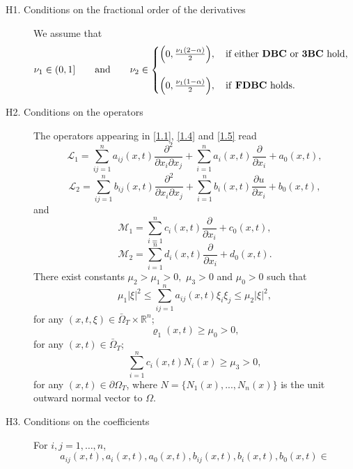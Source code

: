 \documentclass[reqno]{amsart}
\theoremstyle{definition}
\numberwithin{equation}{section}
\begin{document}
\begin{description}
\smallskip
 \item[H1. Conditions on the fractional order of the derivatives] We assume that
\begin{equation*}
\nu_1\in(0,1]\qquad \text{and}\qquad
\nu_2\in
\begin{cases}
\Big(0,\frac{\nu_1(2-\alpha)}{2}\Big),\quad\text{if either \textbf{DBC} or \textbf{3BC} hold},\\
\\
\Big(0,\frac{\nu_1(1-\alpha)}{2}\Big), \quad\text{if  \textbf{FDBC} holds}.
\end{cases}
\end{equation*}
\smallskip
\item[H2. Conditions on the operators]
The operators
appearing in \eqref{1.1}, \eqref{1.4} and \eqref{1.5} read
\begin{equation*}
\mathcal{L}_{1}=\sum_{ij=1}^{n} a_{ij}(x,t)\frac{\partial^{2}}{\partial
x_{i}\partial x_{j}}
+\sum_{i=1}^{n}a_{i}(x,t)\frac{\partial }{\partial
x_{i}}+a_{0}(x,t),
\end{equation*}
\begin{equation*}
\mathcal{L}_{2}=\sum_{ij=1}^{n}b_{ij}(x,t)\frac{\partial^{2}}{\partial
x_{i}\partial x_{j}}+\sum_{i=1}^{n}b_{i}(x,t)\frac{\partial u}{\partial
x_{i}}+b_{0}(x,t),
\end{equation*}
and
$$
\mathcal{M}_1=\sum_{i=1}^{n}c_{i}(x,t)\frac{\partial
}{\partial x_{i}}+c_0(x,t),
$$
$$
\mathcal{M}_2=\sum_{i=1}^{n}d_{i}(x,t)\frac{\partial
}{\partial x_{i}}+d_0(x,t).
$$
 There exist constants
$\mu_{2}>\mu_1>0,$ $\mu_3>0$ and $\mu_0>0$ such that
     \begin{equation*}
\mu_{1}|\xi|^{2}
\leq\sum_{ij=1}^{n}a_{ij}(x,t)\xi_{i}\xi_{j}\leq\mu_{2}|\xi|^{2},
    \end{equation*}
   for any $(x,t,\xi)\in\bar{\Omega}_{T}\times \mathbb{R}^{n}$;
	\[
	\varrho_{1}(x,t)\geq \mu_0>0,
	\]
	for any $(x,t)\in\bar{\Omega}_{T}$;
    \begin{equation*}
   \sum_{i=1}^{n}c_{i}(x,t)N_{i}(x)  \geq \mu_{3}>0,
    \end{equation*}
    for any $(x,t)\in\partial\Omega_{T}$,
    where $N=\{N_{1}(x),...,N_{n}(x)\}$ is the unit
    outward normal vector to $\Omega$.
    \medskip
    \item[H3. Conditions on the coefficients] For $i,j=1,\ldots,n$,
    \begin{equation*}
   a_{ij}(x,t), a_{i}(x,t),a_{0}(x,t), b_{ij}(x,t),
    b_{i}(x,t),b_{0}(x,t) \in

\end{equation*}
\end{description}
\end{document}
